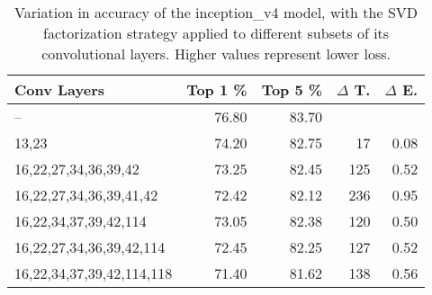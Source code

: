 \begin{table}
\centering
\begin{tabular}{|l|r|r|r|r|}
\hline
Conv Layers & Top 1 \% & Top 5 \% & $\Delta$ T. & $\Delta$ E. \\\hline
-- & 76.80 & 83.70 &  & \\\hline
13,23 & 74.20 & 82.75 & 17 & 0.08 \\\hline
16,22,27,34,36,39,42 & 73.25 & 82.45 & 125 & 0.52 \\\hline
16,22,27,34,36,39,41,42 & 72.42 & 82.12 & 236 & 0.95 \\\hline
16,22,34,37,39,42,114 & 73.05 & 82.38 & 120 & 0.50 \\\hline
16,22,27,34,36,39,42,114 & 72.45 & 82.25 & 127 & 0.52 \\\hline
16,22,34,37,39,42,114,118 & 71.40 & 81.62 & 138 & 0.56 \\\hline
\end{tabular}
\caption{Variation in accuracy of the inception\_v4 model, with the SVD factorization strategy applied to different subsets of its convolutional layers. Higher values represent lower loss.}
\label{inception_v4-accuracy}
\end{table}
